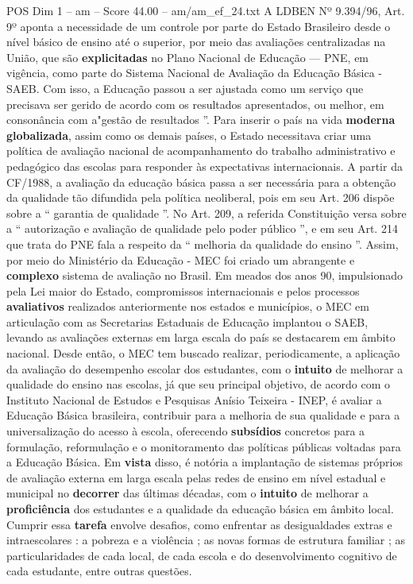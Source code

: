 \begin{textsample}{POS Dim 1 – am – Score 44.00 – am/am\_ef\_24.txt}
A LDBEN Nº 9.394/96, Art. 9º aponta a necessidade de um controle por parte do Estado Brasileiro desde o nível básico de ensino até o superior, por meio das avaliações centralizadas na União, que são \textbf{explicitadas} no Plano Nacional de Educação — PNE, em vigência, como parte do Sistema Nacional de Avaliação da Educação Básica - SAEB.
Com isso, a Educação passou a ser ajustada como um serviço que precisava ser gerido de acordo com os resultados apresentados, ou melhor, em consonância com a"gestão de resultados ”.
Para inserir o país na vida \textbf{moderna} \textbf{globalizada}, assim como os demais países, o Estado necessitava criar uma política de avaliação nacional de acompanhamento do trabalho administrativo e pedagógico das escolas para responder às expectativas internacionais.
A partir da CF/1988, a avaliação da educação básica passa a ser necessária para a obtenção da qualidade tão difundida pela política neoliberal, pois em seu Art. 206 dispõe sobre a “ garantia de qualidade ”.
No Art. 209, a referida Constituição versa sobre a “ autorização e avaliação de qualidade pelo poder público ”, e em seu Art. 214 que trata do PNE fala a respeito da “ melhoria da qualidade do ensino ”.
Assim, por meio do Ministério da Educação - MEC foi criado um abrangente e \textbf{complexo} sistema de avaliação no Brasil.
Em meados dos anos 90, impulsionado pela Lei maior do Estado, compromissos internacionais e pelos processos \textbf{avaliativos} realizados anteriormente nos estados e municípios, o MEC em articulação com as Secretarias Estaduais de Educação implantou o SAEB, levando as avaliações externas em larga escala do país se destacarem em âmbito nacional.
Desde então, o MEC tem buscado realizar, periodicamente, a aplicação da avaliação do desempenho escolar dos estudantes, com o \textbf{intuito} de melhorar a qualidade do ensino nas escolas, já que seu principal objetivo, de acordo com o Instituto Nacional de Estudos e Pesquisas Anísio Teixeira - INEP, é avaliar a Educação Básica brasileira, contribuir para a melhoria de sua qualidade e para a universalização do acesso à escola, oferecendo \textbf{subsídios} concretos para a formulação, reformulação e o monitoramento das políticas públicas voltadas para a Educação Básica.
Em \textbf{vista} disso, é notória a implantação de sistemas próprios de avaliação externa em larga escala pelas redes de ensino em nível estadual e municipal no \textbf{decorrer} das últimas décadas, com o \textbf{intuito} de melhorar a \textbf{proficiência} dos estudantes e a qualidade da educação básica em âmbito local.
Cumprir essa \textbf{tarefa} envolve desafios, como enfrentar as desigualdades extras e intraescolares : a pobreza e a violência ; as novas formas de estrutura familiar ; as particularidades de cada local, de cada escola e do desenvolvimento cognitivo de cada estudante, entre outras questões.

\end{textsample}
